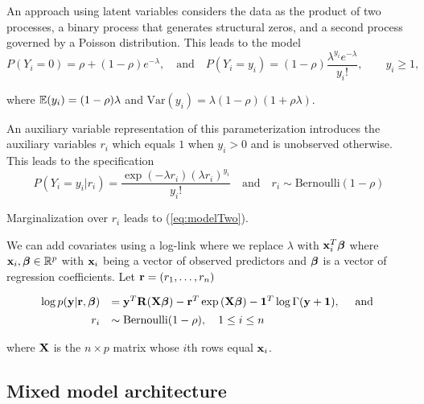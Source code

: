 \documentclass[times, doublespace]{anzsauth}
\begin{document}

\noindent An approach using latent variables considers the data as the product of two processes, a binary process
that generates structural zeros, and a second process governed by a Poisson distribution. This leads to the model
\begin{equation}\label{eq:modelTwo}
	P(Y_i = 0) = \rho + (1 - \rho) e^{-\lambda}, 
	\quad \mbox{and} \quad 
	P(Y_i = y_i) = (1 - \rho) \frac{\lambda^{y_i} e^{-\lambda}} {y_i!},\qquad y_i \ge 1,
\end{equation}

\noindent where ${\mathbb E}(y_i) = (1 - \rho)\lambda$ 
and $\mbox{Var}(y_i) =  \lambda(1 - \rho)(1 + \rho\lambda)$.

\noindent An auxiliary variable representation of this parameterization introduces the auxiliary
variables $r_i$ which equals $1$ when $y_i>0$ and is unobserved otherwise. This leads to the
specification 
$$
P(Y_i=y_i|r_i) = \frac{\exp(-\lambda r_i)(\lambda r_i)^{y_i}}{y_i!} \quad \mbox{and} \quad r_i \sim \mbox{Bernoulli}(1-\rho)
$$

\noindent Marginalization over $r_i$ leads to (\ref{eq:modelTwo}).

\noindent We can add covariates using a log-link where we replace $\lambda$ with ${\bf x}_i^T{\boldsymbol \beta}$ where
${\bf x}_i,{\boldsymbol \beta}\in{\mathbb R}^p$ with ${\bf x}_i$ being a vector of observed predictors and ${\boldsymbol \beta}$ is 
a vector of regression coefficients. Let ${\bf r} = (r_1,\ldots,r_n)$
 
\begin{equation}\label{eq:main}
	\begin{array}{rl}
		\log p({\bf y}|{\bf r}, {\boldsymbol \beta}) 
		    & = {\bf y}^T {\bf R} ({\bf X}{\boldsymbol \beta})                              
		- {\bf r}^T \exp{({\bf X}{\boldsymbol\beta})} 
		- {\bf 1}^T \log{\Gamma{({\bf y}+ {\bf1})}}, \quad \mbox{ and }\\ [1ex]
		r_i & \sim \text{Bernoulli}(1-\rho), \quad 1 \leq i \leq n \\
	\end{array}
\end{equation} 

\noindent where ${\bf X}$ is the $n\times p$ matrix whose $i$th rows equal ${\bf x}_i$.


\subsection{Mixed model architecture}
\end{document}

